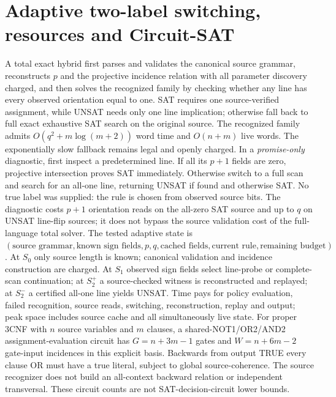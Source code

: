\documentclass[11pt]{article}
\begin{document}
\section{Adaptive two-label switching, resources and Circuit-SAT}
A total exact hybrid first parses and validates the canonical source grammar, reconstructs $p$ and the projective incidence relation with all parameter discovery charged, and then solves the recognized family by checking whether any line has every observed orientation equal to one. SAT requires one source-verified assignment, while UNSAT needs only one line implication; otherwise fall back to full exact exhaustive SAT search on the original source. The recognized family admits $O(q^2+m\log(m+2))$ word time and $O(n+m)$ live words. The exponentially slow fallback remains legal and openly charged.
In a \emph{promise-only} diagnostic, first inspect a predetermined line. If all its $p+1$ fields are zero, projective intersection proves SAT immediately. Otherwise switch to a full scan and search for an all-one line, returning UNSAT if found and otherwise SAT. No true label was supplied: the rule is chosen from observed source bits. The diagnostic costs $p+1$ orientation reads on the all-zero SAT source and up to $q$ on UNSAT line-flip sources; it does not bypass the source validation cost of the full-language total solver.
The tested adaptive state is $(\text{source grammar},\text{known sign fields},p,q,\text{cached fields},\text{current rule},\text{remaining budget})$. At $S_0$ only source length is known; canonical validation and incidence construction are charged. At $S_1$ observed sign fields select line-probe or complete-scan continuation; at $S_2^+$ a source-checked witness is reconstructed and replayed; at $S_2^-$ a certified all-one line yields UNSAT. Time pays for policy evaluation, failed recognition, source reads, switching, reconstruction, replay and output; peak space includes source cache and all simultaneously live state.
For proper 3CNF with $n$ source variables and $m$ clauses, a shared-NOT1/OR2/AND2 assignment-evaluation circuit has $G=n+3m-1$ gates and $W=n+6m-2$ gate-input incidences in this explicit basis. Backwards from output TRUE every clause OR must have a true literal, subject to global source-coherence. The source recognizer does not build an all-context backward relation or independent transversal. These circuit counts are not SAT-decision-circuit lower bounds.
\end{document}
